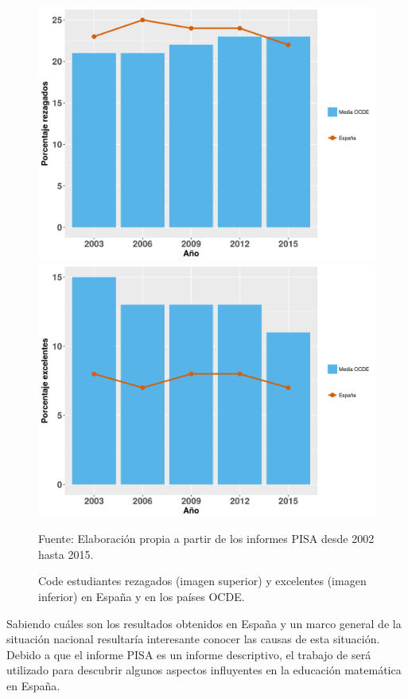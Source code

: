 \begin{figure}[hbt]
\centering
\caption{Code estudiantes rezagados (imagen superior) y excelentes (imagen inferior) en España y en los países OCDE. }
\label{fig::PisaRezEx}
\includegraphics[scale=0.45]{img/PisaRezagados.png}
\includegraphics[scale=0.45]{img/PisaExcelentes.png}

\vspace{-0.5cm}
\small{Fuente: Elaboración propia a partir de los informes PISA desde 2002 hasta 2015.}
\end{figure}
\FloatBarrier

Sabiendo cuáles son los resultados obtenidos en España y un marco general de la situación nacional resultaría interesante conocer las causas de esta situación.
%
Debido a que el informe PISA es un informe descriptivo, el trabajo de \cite{ActitudesHaciaMates} será utilizado para descubrir algunos aspectos influyentes en la educación matemática en España.


